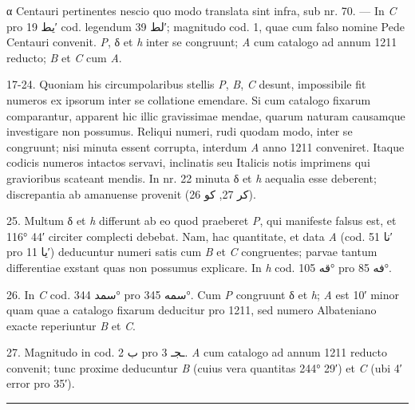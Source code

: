 \documentclass[11pt]{article}
\begin{document}
{\small
\par\hangindent=12mm α Centauri pertinentes nescio quo modo translata sint infra, sub nr. 70. — In \textit{C} pro \textarabic{يط} 19′ cod. legendum \textarabic{لط} 39′; magnitudo cod. 1, quae cum falso nomine Pede Centauri convenit. \textit{P}, δ et \textit{h} inter se congruunt; \textit{A} cum catalogo ad annum 1211 reducto; \textit{B} et \textit{C} cum \textit{A}.
\par\hangindent=12mm 17-24. Quoniam his circumpolaribus stellis \textit{P}, \textit{B}, \textit{C} desunt, impossibile fit numeros ex ipsorum inter se collatione emendare. Si cum catalogo fixarum comparantur, apparent hic illic gravissimae mendae, quarum naturam causamque investigare non possumus. Reliqui numeri, rudi quodam modo, inter se congruunt; nisi minuta essent corrupta, interdum \textit{A} anno 1211 conveniret. Itaque codicis numeros intactos servavi, inclinatis seu Italicis notis imprimens qui gravioribus scateant mendis. In nr. 22 minuta δ et \textit{h} aequalia esse deberent; discrepantia ab amanuense provenit (\textarabic{كر} 27, \textarabic{كو} 26).
\par\hangindent=12mm 25. Multum δ et \textit{h} differunt ab eo quod praeberet \textit{P}, qui manifeste falsus est, et 116° 44′ circiter complecti debebat. Nam, hac quantitate, et data \textit{A} (cod. \textarabic{نا} 51′ pro \textarabic{يا} 11′) deducuntur numeri satis cum \textit{B} et \textit{C} congruentes; parvae tantum differentiae exstant quas non possumus explicare. In \textit{h} cod. \textarabic{قه} 105° pro \textarabic{فه} 85°.
\par\hangindent=12mm 26. In \textit{C} cod. \textarabic{سمد} 344° pro \textarabic{سمه} 345°. Cum \textit{P} congruunt δ et \textit{h}; \textit{A} est 10′ minor quam quae a catalogo fixarum deducitur pro 1211, sed numero Albateniano exacte reperiuntur \textit{B} et \textit{C}.
\par\hangindent=12mm 27. Magnitudo in cod. \textarabic{ب} 2 pro \textarabic{ـجـ} 3. \textit{A} cum catalogo ad annum 1211 reducto convenit; tunc proxime deducuntur \textit{B} (cuius vera quantitas 244° 29′) et \textit{C} (ubi 4′ error pro 35′).
\par}
\clearpage
\noindent{}\par\vspace{-1mm}\noindent\rule{\textwidth}{.4pt}\par\vspace{2mm}
\end{document}
